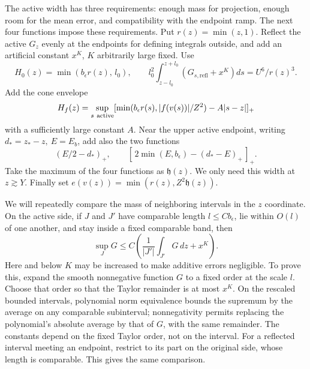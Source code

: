 The active width has three requirements: enough mass for projection,
enough room for the mean error, and compatibility with the endpoint
ramp.  The next four functions impose these requirements.  Put \(r(z)=\min(z,1)\). Reflect the active \(G_z\) evenly at the endpoints for defining integrals outside, and add an artificial constant \(x^K\), \(K\) arbitrarily large fixed. Use
\begin{equation*}
H_0(z)=\min(b_\epsilon r(z),\,l_0),\qquad
 l_0^2\int_{z-l_0}^{z+l_0}(G_{s,\mathrm{refl}}+x^K)ds
                     =U^6/r(z)^3.
\end{equation*}
Add the cone envelope
\begin{equation*}
H_f(z)=\sup_{s\ {\rm active}}
       [\min(b_\epsilon r(s), |f(v(s))|/Z^2)-A|s-z|]_+
\end{equation*}
with a sufficiently large constant \(A\). Near the upper active endpoint, writing \(d_*=z_*-z,\ E=E_b\), add also the two functions
\begin{equation*}
(E/2-d_*)_+,\qquad
 [\,2\min(E,b_\epsilon)-(d_*-E)_+\,]_+ .
\end{equation*}
Take the maximum of the four functions as \(\mathfrak h(z)\). We only need this width at \(z\gtrsim Y\). Finally set \(e(v(z))=\min(r(z),Z^2\mathfrak h(z))\).

We will repeatedly compare the mass of neighboring intervals in the
$z$ coordinate.  On the active side, if $J$ and $J'$ have comparable
length $l\le Cb_\epsilon$, lie within $O(l)$ of one another, and stay
inside a fixed comparable band, then
\[
 \sup_J G\le C\left(\frac1{|J'|}\int_{J'}G\,dz+x^K\right).
\]
Here and below $K$ may be increased to make additive errors negligible.
To prove this, expand the smooth nonnegative function $G$ to a fixed
order at the scale $l$.  Choose that order so that the Taylor remainder
is at most $x^K$.  On the rescaled bounded intervals, polynomial norm
equivalence bounds the supremum by the average on any comparable
subinterval; nonnegativity permits replacing the polynomial's absolute
average by that of $G$, with the same remainder.  The constants depend
on the fixed Taylor order, not on the interval.  For a reflected
interval meeting an endpoint, restrict to its part on the original
side, whose length is comparable.  This gives the same comparison.

